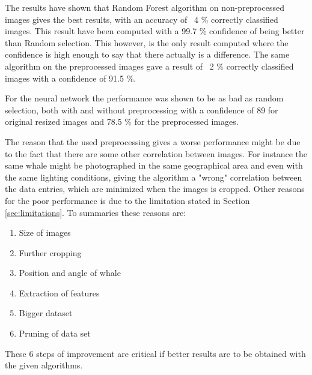 
The results have shown that Random Forest algorithm on non-preprocessed images gives the best results, with an accuracy of ~4 \% correctly classified images. This result have been computed with a 99.7 \% confidence of being better than Random selection. This however, is the only result computed where the confidence is high enough to say that there actually is a difference.
The same algorithm on the preprocessed images gave a result of ~2 \% correctly classified images with a confidence of 91.5 \%.

For the neural network the performance was shown to be as bad as random selection, both with and without preprocessing with a confidence of 89 for original resized images and 78.5 \% for the preprocessed images.

The reason that the used preprocessing gives a worse performance might be due to the fact that there are some other correlation between images. For instance the same whale might be photographed in the same geographical area and even with the same lighting conditions, giving the algorithm a "wrong" correlation between the data entries, which are minimized when the images is cropped.
Other reasons for the poor performance is due to the limitation stated in Section \ref{sec:limitations}.
To summaries these reasons are:
\begin{enumerate}
\item Size of images 
\item Further cropping
\item Position and angle of whale
\item Extraction of features
\item Bigger dataset
\item Pruning of data set
\end{enumerate}
These 6 steps of improvement are critical if better results are to be obtained with the given algorithms. 

